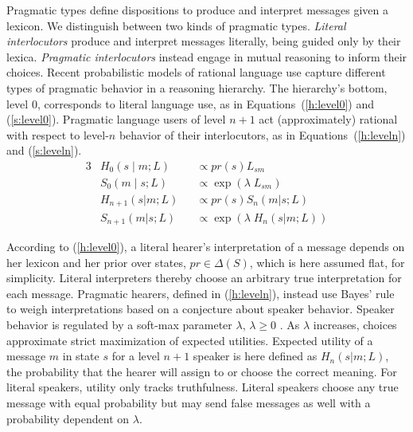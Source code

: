\documentclass[a4paper, 11pt]{article}
\theoremstyle{Satz}
\newcommand{\state}{\ensuremath{s}\xspace}		%
\newcommand{\messg}{\ensuremath{m}\xspace}		%
\begin{document}
Pragmatic types define dispositions to produce and interpret messages given a lexicon. We
distinguish between two kinds of pragmatic types. {\em Literal interlocutors} produce and
interpret messages literally, being guided only by their lexica. {\em Pragmatic interlocutors}
instead engage in mutual reasoning to inform their choices. Recent probabilistic models of
rational language use
\citep{frank+goodman:2012,FrankeJager2015:Probabilistic-p,GoodmanFrank2016:Pragmatic-Langu}
capture different types of pragmatic behavior in a reasoning hierarchy. The hierarchy's bottom,
level $0$, corresponds to literal language use, as in Equations~(\ref{h:level0}) and
(\ref{s:level0}). Pragmatic language users of level $n + 1$ act (approximately) rational with
respect to level-$n$ behavior of their interlocutors, as in Equations~(\ref{h:leveln}) and
(\ref{s:leveln}).
\begin{alignat}{3}
&H_{0}(s \mid m;L) &&\propto pr(s) L_{sm} \label{h:level0}\\
&S_{0}(m \mid s;L) &&\propto \exp(\lambda \; L_{sm}) \label{s:level0}\\
&H_{n+1}(s|m;L) &&\propto pr(s) S_{n}(m|s;L) \label{h:leveln}\\
&S_{n+1}(m|s;L) &&\propto  \exp(\lambda \; H_{n}(s|m;L)) \label{s:leveln}
\end{alignat}

According to (\ref{h:level0}), a literal hearer's interpretation of a message depends on her
lexicon and her prior over states, $pr \in \Delta(S)$, which is here assumed flat, for
simplicity. Literal interpreters thereby choose an arbitrary true interpretation for each
message. Pragmatic hearers, defined in (\ref{h:leveln}), instead use Bayes' rule to weigh
interpretations based on a conjecture about speaker behavior. Speaker behavior is regulated by
a soft-max parameter $\lambda$, $\lambda \geq 0$ \citep{luce:1959,sutton+barto:1998}. As
$\lambda$ increases, choices approximate strict maximization of expected utilities. Expected
utility of a message $\messg$ in state $\state$ for a level $n+1$ speaker is here defined as
$H_{n}(s|m;L)$, the probability that the hearer will assign to or choose the correct
meaning. For literal speakers, utility only tracks truthfulness. Literal speakers choose any
true message with equal probability but may send false messages as well with a probability
dependent on $\lambda$.
\end{document}
